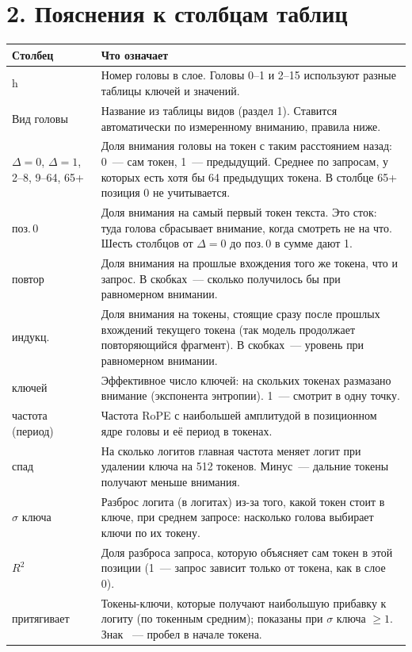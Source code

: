 \documentclass[10pt]{article}
\begin{document}
\section*{2. Пояснения к столбцам таблиц}
\begin{center}\begin{tabular}{|p{3.3cm}|p{22.0cm}|}
\hline \rowcolor{head}\textbf{Столбец} & \textbf{Что означает} \\ \hline
h & Номер головы в слое. Головы 0–1 и 2–15 используют разные таблицы ключей и значений. \\ \hline
Вид головы & Название из таблицы видов (раздел 1). Ставится автоматически по измеренному вниманию, правила ниже. \\ \hline
$\Delta{=}0$, $\Delta{=}1$, 2–8, 9–64, 65+ & Доля внимания головы на токен с таким расстоянием назад: 0~— сам токен, 1~— предыдущий. Среднее по запросам, у которых есть хотя бы 64 предыдущих токена. В столбце 65+ позиция 0 не учитывается. \\ \hline
поз.\,0 & Доля внимания на самый первый токен текста. Это сток: туда голова сбрасывает внимание, когда смотреть не на что. Шесть столбцов от $\Delta{=}0$ до поз.\,0 в сумме дают 1. \\ \hline
повтор & Доля внимания на прошлые вхождения того же токена, что и запрос. В скобках~— сколько получилось бы при равномерном внимании. \\ \hline
индукц. & Доля внимания на токены, стоящие сразу после прошлых вхождений текущего токена (так модель продолжает повторяющийся фрагмент). В скобках~— уровень при равномерном внимании. \\ \hline
ключей & Эффективное число ключей: на скольких токенах размазано внимание (экспонента энтропии). 1~— смотрит в одну точку. \\ \hline
частота (период) & Частота RoPE с наибольшей амплитудой в позиционном ядре головы и её период в токенах. \\ \hline
спад & На сколько логитов главная частота меняет логит при удалении ключа на 512 токенов. Минус~— дальние токены получают меньше внимания. \\ \hline
$\sigma$ ключа & Разброс логита (в логитах) из-за того, какой токен стоит в ключе, при среднем запросе: насколько голова выбирает ключи по их токену. \\ \hline
$R^2$ & Доля разброса запроса, которую объясняет сам токен в этой позиции (1~— запрос зависит только от токена, как в слое 0). \\ \hline
притягивает & Токены-ключи, которые получают наибольшую прибавку к логиту (по токенным средним); показаны при $\sigma$ ключа $\ge 1$. Знак \texttt{\textvisiblespace}~— пробел в начале токена. \\ \hline
\hline\end{tabular}\end{center}
\end{document}
